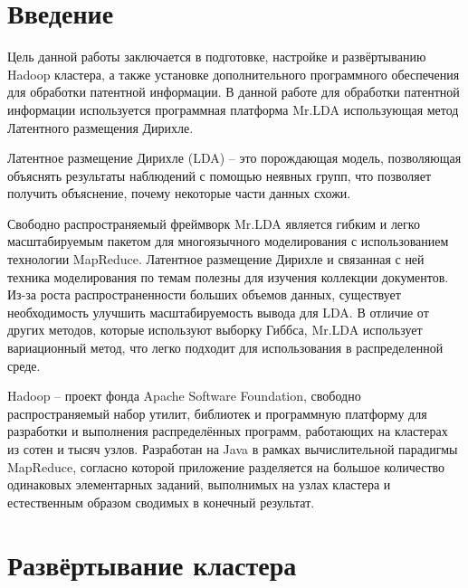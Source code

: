 \chapter{Введение}
Цель данной работы заключается в подготовке, настройке и развёртыванию Hadoop кластера, 
а также установке дополнительного программного обеспечения для обработки патентной информации.
В данной работе для обработки патентной информации используется программная платформа 
Mr.LDA использующая метод Латентного размещения Дирихле. 

Латентное размещение Дирихле (LDA) -- это порождающая модель, позволяющая объяснять 
результаты наблюдений с помощью неявных групп, что позволяет получить объяснение, почему 
некоторые части данных схожи. 

Свободно распространяемый фреймворк Mr.LDA является гибким и легко масштабируемым пакетом 
для многоязычного моделирования с использованием технологии MapReduce. Латентное размещение 
Дирихле и связанная с ней техника моделирования по темам полезны для изучения коллекции 
документов. Из-за роста распространенности больших объемов данных, существует необходимость 
улучшить масштабируемость вывода для LDA. В отличие от других методов, которые используют 
выборку Гиббса, Mr.LDA использует вариационный метод, что легко подходит для использования 
в распределенной среде.

Hadoop -- проект фонда Apache Software Foundation, свободно распространяемый набор утилит, 
библиотек и программную платформу для разработки и выполнения распределённых программ, работающих 
на кластерах из сотен и тысяч узлов. Разработан на Java в рамках вычислительной парадигмы 
MapReduce, согласно которой приложение разделяется на большое количество одинаковых элементарных 
заданий, выполнимых на узлах кластера и естественным образом сводимых в конечный результат.

\newpage

\chapter{Развёртывание кластера}
